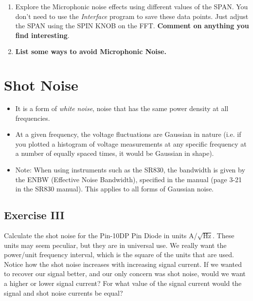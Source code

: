 \documentclass{../lab}
\begin{document}
\begin{enumerate}
    Notice how large harmonic components appear around the frequency that you're shaking the cable. \textbf{Why are there multiple peaks? Why are they broad?} Notice how a little bit of shaking can produce noise that easily matches the Capacitive pick-up at 60 Hz. Also note how it is harder to isolate non-affected frequencies (i.e. the noise is spread out over a large band of frequencies, not just peaked at 60 Hz or so).

    \item Explore the Microphonic noise effects using different values of the SPAN. You don't need to use the \emph{Interface} program to save these data points. Just adjust the SPAN using the SPIN KNOB on the FFT. \textbf{Comment on anything you find interesting}.

    \item \textbf{List some ways to avoid Microphonic Noise.}

\end{enumerate}

\section{Shot Noise}

\begin{itemize}
    \item It is a form of \emph{white noise}, noise that has the same power density at all frequencies.

    \item At a given frequency, the voltage fluctuations are Gaussian in nature (i.e. if you plotted a histogram of voltage measurements at any specific frequency at a number of equally spaced times, it would be Gaussian in shape).

    \item Note: When using instruments such as the SR830, the bandwidth is given by the ENBW (Effective Noise Bandwidth), specified in the manual (page 3-21 in the SR830 manual). This applies to all forms of Gaussian noise.

\end{itemize}

\subsection{Exercise III}

Calculate the shot noise for the Pin-10DP Pin Diode in units A/$\sqrt{\text{Hz}}$. These units may seem peculiar, but they are in universal use. We really want the power/unit frequency interval, which is the square of the units that are used. Notice how the shot noise increases with increasing signal current. If we wanted to recover our signal better, and our only concern was shot noise, would we want a higher or lower signal current? For what value of the signal current would the signal and shot noise currents be equal?
\end{document}
